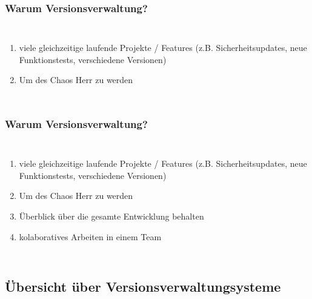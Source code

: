 \documentclass{beamer}
\begin{document}
\begin{frame}\frametitle{Warum Versionsverwaltung?}
\begin{columns}
                \begin{enumerate}
                \item viele gleichzeitige laufende Projekte / Features (z.B. Sicherheitsupdates, neue Funktionstests, verschiedene Versionen)
                \item Um des Chaos Herr zu werden
                \end{enumerate}
\end{columns}
\end{frame}

\begin{frame}\frametitle{Warum Versionsverwaltung?}
\begin{columns}
                \begin{enumerate}
                \item viele gleichzeitige laufende Projekte / Features (z.B. Sicherheitsupdates, neue  Funktionstests, verschiedene Versionen)
                \item Um des Chaos Herr zu werden
                \item Überblick über die gesamte Entwicklung behalten
                \item kolaboratives Arbeiten in einem Team
                \end{enumerate}
\end{columns}
\end{frame}

\subsection{Übersicht über Versionsverwaltungsysteme}
\end{document}
